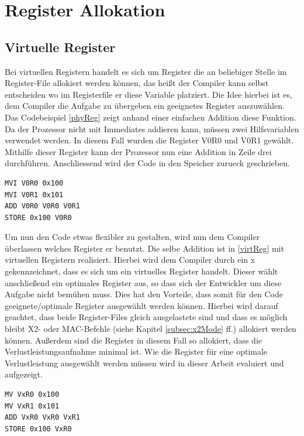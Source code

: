 \section{Register Allokation}
\label{sec:register allok}
\subsection{Virtuelle Register}
Bei virtuellen Registern handelt es sich um Register die an beliebiger Stelle im Register-File allokiert werden können, das heißt der Compiler kann selbst entscheiden wo im Registerfile er diese Variable platziert. 
Die Idee hierbei ist es, dem Compiler die Aufgabe zu übergeben ein geeignetes Register auszuwählen. Das Codebeispiel \ref{phyReg} zeigt anhand einer einfachen Addition diese Funktion. Da der Prozessor nicht mit Immediates addieren kann, müssen zwei Hilfsvariablen verwendet werden. In diesem Fall wurden die Register V0R0 und V0R1 gewählt. Mithilfe dieser Register kann der Prozessor nun eine Addition in Zeile drei durchführen. Anschliessend wird der Code in den Speicher zurueck geschrieben.
\newpage
\renewcommand{\lstlistingname}{Codebeispiel}
\begin{lstlisting}[frame=single, caption={physikalische Register},captionpos=b,label=phyReg]
MVI V0R0 0x100
MVI V0R1 0x101
ADD V0R0 V0R0 V0R1
STORE 0x100 V0R0
\end{lstlisting}
Um nun den Code etwas flexibler zu gestalten, wird  nun dem Compiler überlassen welches Register er benutzt. Die selbe Addition ist in \ref{virtReg} mit virtuellen Registern realisiert. Hierbei wird dem Compiler durch ein  x gekennzeichnet, dass es sich um ein virtuelles Register handelt. Dieser wählt anschließend ein optimales Register aus, so dass sich der Entwickler um diese Aufgabe nicht bemühen muss. Dies hat den Vorteile, dass somit für den Code geeignete/optimale Register ausgewählt werden können. Hierbei wird darauf geachtet, dass beide Register-Files gleich ausgelastete sind und dass es möglich bleibt X2- oder MAC-Befehle (siehe Kapitel \ref{subsec:x2Mode} ff.) allokiert werden können. Außerdem sind die Register in diesem Fall so allokiert, dass die Verlustleistungsaufnahme minimal ist. Wie die Register für eine optimale Verlustleistung ausgewählt werden müssen wird in dieser Arbeit evaluiert und aufgezeigt.

\begin{lstlisting}[frame=single,caption={virtuelle Register},captionpos=b,label=virtReg]
MV VxR0 0x100
MV VxR1 0x101
ADD VxR0 VxR0 VxR1
STORE 0x100 VxR0
\end{lstlisting}
